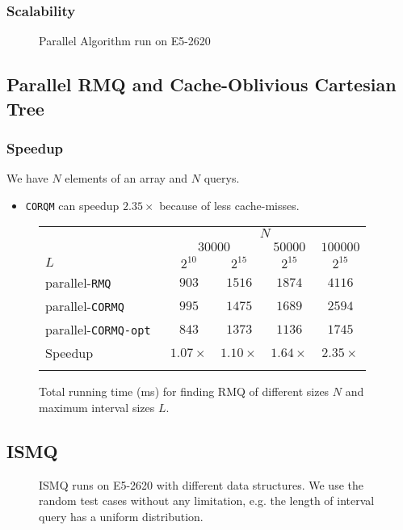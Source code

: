 \begin{frame}
	\frametitle{Scalability}
	\begin{figure}[!ht]
		\centering
		\subfigure[Scalability]{
			
			\label{fig:fig-parallel}
		}
		\caption{Parallel Algorithm run on E5-2620}
	\end{figure}
\end{frame}

\subsection{Parallel RMQ and Cache-Oblivious Cartesian Tree}
\begin{frame}
	\frametitle{Speedup}
	We have $N$ elements of an array and $N$ querys.
	\begin{itemize}
		\setlength\itemsep{1em}
		\item \texttt{CORQM} can speedup $2.35\times$ because of less cache-misses.
	\end{itemize}
	\begin{figure}[!ht]
		\begin{center}
			\begin{tabular}{l c c c c}
				\firsthline
					& \multicolumn{4}{c}{$N$} \\
					\cline{2-5}
						& \multicolumn{2}{c}{$30000$} & $50000$ & $100000$ \\
					$L$ & $2^{10}$ & $2^{15}$ & $2^{15}$ & $2^{15}$ \\
					\hline
					parallel-\tt{RMQ}   	& $903$ & $1516$ & $1874$ & $4116$ \\
					parallel-\tt{CORMQ} 	& $995$ & $1475$ & $1689$ & $2594$ \\
					parallel-\tt{CORMQ-opt} & $843$ & $1373$ & $1136$ & $1745$ \\
					\hline
					Speedup & $1.07\times$ & $1.10\times$ & $1.64\times$ & $2.35\times$\\
				\lasthline
			\end{tabular}
			\caption{Total running time (ms) for finding RMQ of different sizes $N$ and maximum interval sizes $L$.}
			\label{fig:CORMQ}
		\end{center}
	\end{figure}
\end{frame}

\subsection{ISMQ}
\begin{frame}
	\begin{figure}[!thb]
	  \centering
	  
	  \caption{ISMQ runs on E5-2620 with different data structures. We use the random test cases without any limitation, e.g. the length of interval query has a uniform distribution.}
	  \label{fig:fig-ISMQcmp}
	\end{figure}
\end{frame}

\begin{frame}
	
\end{frame}